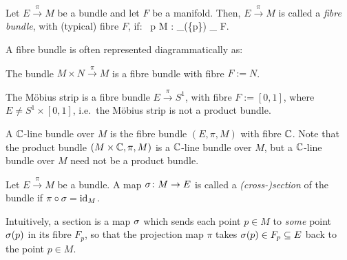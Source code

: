 \bd
Let $E\xrightarrow{\,\pi\,}M$ be a bundle and let $F$ be a manifold. Then, $E\xrightarrow{\,\pi\,}M$ is called a \emph{fibre bundle}, with (typical) fibre $F$, if:
\bse
\forall \, p \in M : _\pi(\{p\}) \cong_ F.
\ese
\ed

A fibre bundle is often represented diagrammatically as:
\bse
{}
\ese

\be
The bundle $M\times N\xrightarrow{\,\pi\,}M$ is a fibre bundle with fibre $F:=N$.
\ee

\be
The M\"obius strip is a fibre bundle $E\xrightarrow{\,\pi\,}S^1$, with fibre $F:=[0,1]$, where $E\neq S^1\times[0,1]$, i.e.\ the M\"obius strip is not a product bundle. 
\ee

\be
A $\mathbb{C}$-line bundle over $M$ is the fibre bundle $(E,\pi,M)$ with fibre $\mathbb{C}$. Note that the product bundle $(M\times \mathbb{C},\pi,M)$ is a $\mathbb{C}$-line bundle over $M$, but a $\mathbb{C}$-line bundle over $M$ need not be a product bundle.
\ee

\bd
Let $E\xrightarrow{\,\pi\,}M$ be a bundle. A map $\sigma\colon M \to E$ is called a \emph{(cross-)section} of the bundle if $\pi \circ \sigma = \operatorname{id}_M$.
\ed

Intuitively, a section is a map $\sigma$ which sends each point $p\in M$ to \emph{some} point $\sigma(p)$ in its fibre $F_p$, so that the projection map $\pi$ takes $\sigma(p) \in F_p\subseteq E$ back to the point $p\in M$.


\begin{figure}[h!]
\centering
{}
\end{figure}

